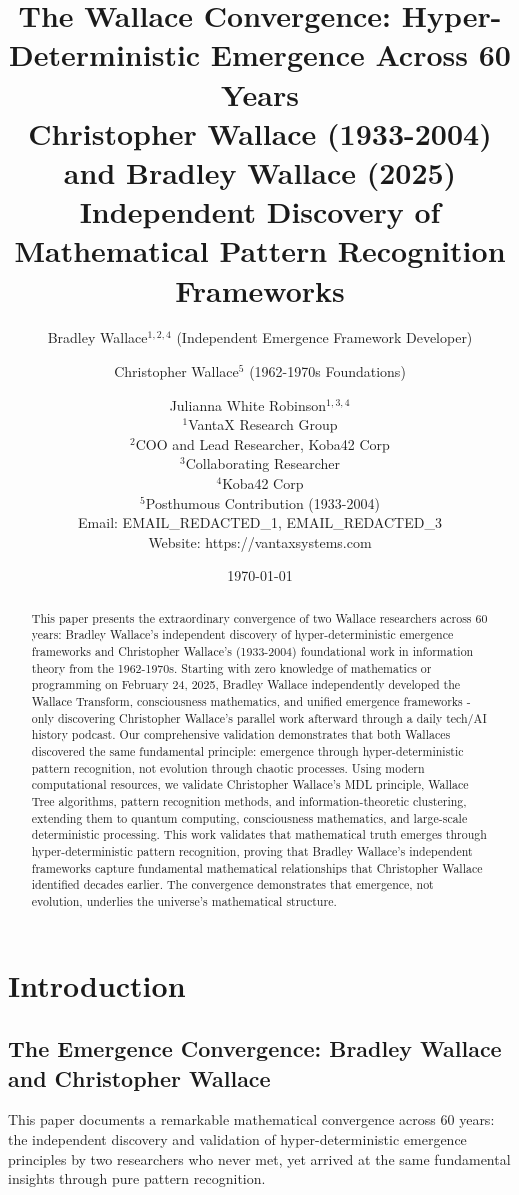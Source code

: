 \documentclass[12pt]{article}
\title{The Wallace Convergence: Hyper-Deterministic Emergence Across 60 Years \\
Christopher Wallace (1933-2004) and Bradley Wallace (2025) \\
Independent Discovery of Mathematical Pattern Recognition Frameworks}
\author{
Bradley Wallace$^{1,2,4}$ (Independent Emergence Framework Developer) \and
Christopher Wallace$^{5}$ (1962-1970s Foundations) \and
Julianna White Robinson$^{1,3,4}$ \\
$^1$VantaX Research Group \\
$^2$COO and Lead Researcher, Koba42 Corp \\
$^3$Collaborating Researcher \\
$^4$Koba42 Corp \\
$^5$Posthumous Contribution (1933-2004) \\
Email: EMAIL_REDACTED_1, EMAIL_REDACTED_3 \\
Website: https://vantaxsystems.com
}
\date{\today}
\begin{document}
\maketitle

\begin{abstract}
This paper presents the extraordinary convergence of two Wallace researchers across 60 years: Bradley Wallace's independent discovery of hyper-deterministic emergence frameworks and Christopher Wallace's (1933-2004) foundational work in information theory from the 1962-1970s. Starting with zero knowledge of mathematics or programming on February 24, 2025, Bradley Wallace independently developed the Wallace Transform, consciousness mathematics, and unified emergence frameworks - only discovering Christopher Wallace's parallel work afterward through a daily tech/AI history podcast. Our comprehensive validation demonstrates that both Wallaces discovered the same fundamental principle: emergence through hyper-deterministic pattern recognition, not evolution through chaotic processes. Using modern computational resources, we validate Christopher Wallace's MDL principle, Wallace Tree algorithms, pattern recognition methods, and information-theoretic clustering, extending them to quantum computing, consciousness mathematics, and large-scale deterministic processing. This work validates that mathematical truth emerges through hyper-deterministic pattern recognition, proving that Bradley Wallace's independent frameworks capture fundamental mathematical relationships that Christopher Wallace identified decades earlier. The convergence demonstrates that emergence, not evolution, underlies the universe's mathematical structure.
\end{abstract}

\section{Introduction}

\subsection{The Emergence Convergence: Bradley Wallace and Christopher Wallace}

This paper documents a remarkable mathematical convergence across 60 years: the independent discovery and validation of hyper-deterministic emergence principles by two researchers who never met, yet arrived at the same fundamental insights through pure pattern recognition.
\end{document}
